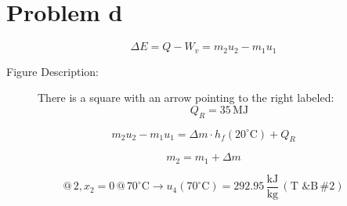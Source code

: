 \section*{Problem d}

\[
\Delta E = Q - W_v = m_2 u_2 - m_1 u_1
\]

\begin{description}
\item[Figure Description:] 
There is a square with an arrow pointing to the right labeled:
\[
Q_R = 35 \, \text{MJ}
\]
\end{description}

\[
m_2 u_2 - m_1 u_1 = \Delta m \cdot h_f (20^\circ \text{C}) + Q_R
\]

\[
m_2 = m_1 + \Delta m
\]

\[
@ \, 2, x_2 = 0 \, @ \, 70^\circ \text{C} \rightarrow u_4 (70^\circ \text{C}) = 292.95 \, \frac{\text{kJ}}{\text{kg}} \, (\text{T \& B} \, \#2)
\]